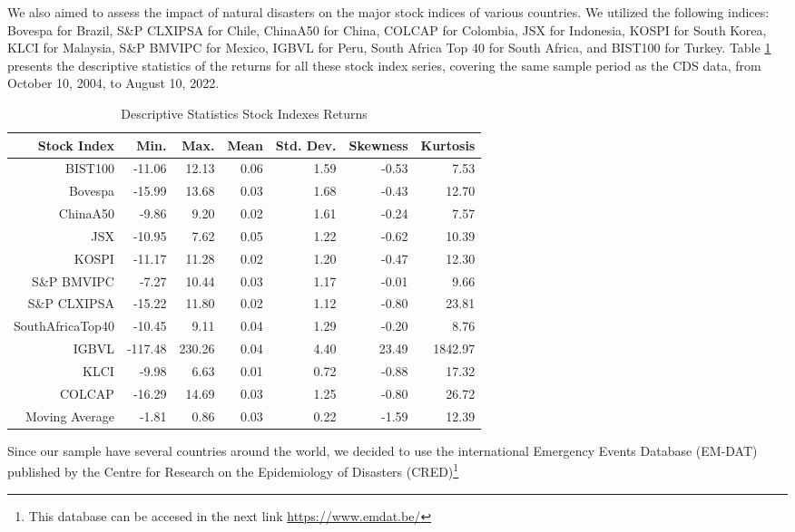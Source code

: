 \documentclass{article}
\begin{document}
We also aimed to assess the impact of natural disasters on the major stock indices of various countries. 
We utilized the following indices: Bovespa for Brazil, S\&P CLXIPSA for Chile, ChinaA50 for China, 
COLCAP for Colombia, JSX for Indonesia, KOSPI for South Korea, KLCI for Malaysia, S\&P BMVIPC for 
Mexico, IGBVL for Peru, South Africa Top 40 for South Africa, and BIST100 for Turkey. Table 
\ref{table:stock} presents the descriptive statistics of the returns for all these stock index 
series, covering the same sample period as the CDS data, from October 10, 2004, to August 10, 2022. \\

\begin{table}[H]
\centering
\small
\begin{tabular}{rrrrrrr}
  \hline
 Stock Index & Min. & Max. & Mean & Std. Dev. & Skewness & Kurtosis \\ 
  \hline
BIST100 & -11.06 & 12.13 & 0.06 & 1.59 & -0.53 & 7.53 \\ 
  Bovespa & -15.99 & 13.68 & 0.03 & 1.68 & -0.43 & 12.70 \\ 
  ChinaA50 & -9.86 & 9.20 & 0.02 & 1.61 & -0.24 & 7.57 \\ 
  JSX & -10.95 & 7.62 & 0.05 & 1.22 & -0.62 & 10.39 \\ 
  KOSPI & -11.17 & 11.28 & 0.02 & 1.20 & -0.47 & 12.30 \\ 
  S\&P BMVIPC & -7.27 & 10.44 & 0.03 & 1.17 & -0.01 & 9.66 \\ 
  S\&P CLXIPSA & -15.22 & 11.80 & 0.02 & 1.12 & -0.80 & 23.81 \\ 
  SouthAfricaTop40 & -10.45 & 9.11 & 0.04 & 1.29 & -0.20 & 8.76 \\ 
  IGBVL & -117.48 & 230.26 & 0.04 & 4.40 & 23.49 & 1842.97 \\ 
  KLCI & -9.98 & 6.63 & 0.01 & 0.72 & -0.88 & 17.32 \\ 
  COLCAP & -16.29 & 14.69 & 0.03 & 1.25 & -0.80 & 26.72 \\ 
  Moving Average & -1.81 & 0.86 & 0.03 & 0.22 & -1.59 & 12.39 \\ 
   \hline
\end{tabular}
\caption{Descriptive Statistics Stock Indexes Returns}
\label{table:stock}
\end{table}

Since our sample have several countries around the world, we decided to use the international Emergency Events
Database (EM-DAT) published by the Centre for Research on the Epidemiology of Disasters (CRED)\footnote{This database can be 
accesed in the next link \href{https://www.emdat.be/}{https://www.emdat.be/}}
\end{document}
